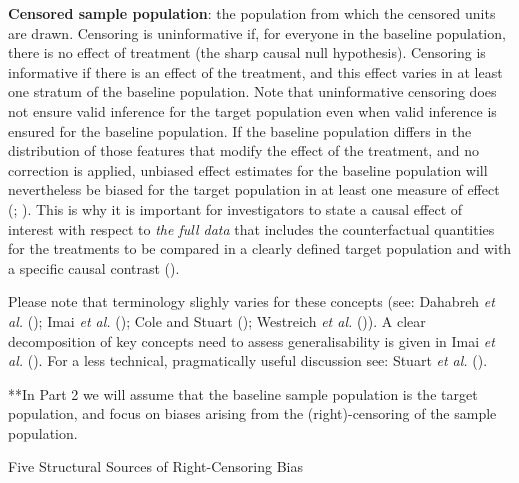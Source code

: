 \documentclass[
  single column]{article}
\begin{document}
\begin{itemize}
  \textbf{Censored sample population}: the population from which the
  censored units are drawn. Censoring is uninformative if, for everyone
  in the baseline population, there is no effect of treatment (the sharp
  causal null hypothesis). Censoring is informative if there is an
  effect of the treatment, and this effect varies in at least one
  stratum of the baseline population. Note that uninformative censoring
  does not ensure valid inference for the target population even when
  valid inference is ensured for the baseline population. If the
  baseline population differs in the distribution of those features that
  modify the effect of the treatment, and no correction is applied,
  unbiased effect estimates for the baseline population will
  nevertheless be biased for the target population in at least one
  measure of effect (; ). This is why
  it is important for investigators to state a causal effect of interest
  with respect to \emph{the full data} that includes the counterfactual
  quantities for the treatments to be compared in a clearly defined
  target population and with a specific causal contrast
  ().
\end{itemize}

Please note that terminology slighly varies for these concepts (see:
Dahabreh \emph{et al.} (); Imai
\emph{et al.} (); Cole and
Stuart (); Westreich \emph{et
al.} ()). A clear
decomposition of key concepts need to assess generalisability is given
in Imai \emph{et al.} ().
For a less technical, pragmatically useful discussion see: Stuart
\emph{et al.} ().

**In Part 2 we will assume that the baseline sample population is the
target population, and focus on biases arising from the
(right)-censoring of the sample population.

\begin{table}

\caption{\label{tbl-terminologycensoring}Five Structural Sources of
Right-Censoring Bias}

\centering{

\terminologycensoring

}

\end{table}%
\end{document}
